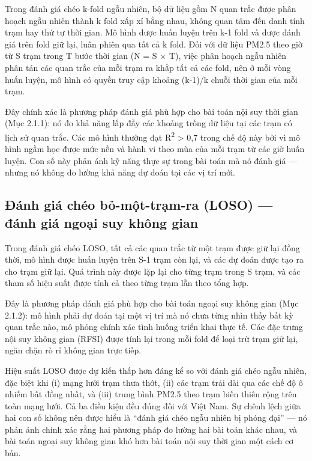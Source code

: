 Trong đánh giá chéo k-fold ngẫu nhiên, bộ dữ liệu gồm N quan trắc được phân hoạch ngẫu nhiên thành k fold xấp xỉ bằng nhau, không quan tâm đến danh tính trạm hay thứ tự thời gian. Mô hình được huấn luyện trên k-1 fold và được đánh giá trên fold giữ lại, luân phiên qua tất cả k fold. Đối với dữ liệu PM2.5 theo giờ từ S trạm trong T bước thời gian (N = S $\times$ T), việc phân hoạch ngẫu nhiên phân tán các quan trắc của mỗi trạm ra khắp tất cả các fold, nên ở mỗi vòng huấn luyện, mô hình có quyền truy cập khoảng (k-1)/k chuỗi thời gian của mỗi trạm.

Đây chính xác là phương pháp đánh giá phù hợp cho bài toán nội suy thời gian (Mục 2.1.1): nó đo khả năng lấp đầy các khoảng trống dữ liệu tại các trạm có lịch sử quan trắc. Các mô hình thường đạt R\textsuperscript{2} > 0,7 trong chế độ này bởi vì mô hình ngầm học được mức nền và hành vi theo mùa của mỗi trạm từ các giờ huấn luyện. Con số này phản ánh kỹ năng thực sự trong bài toán mà nó đánh giá --- nhưng nó không đo lường khả năng dự đoán tại các vị trí mới.

\subsection{Đánh giá chéo bỏ-một-trạm-ra (LOSO) --- đánh giá ngoại suy không gian}

Trong đánh giá chéo LOSO, tất cả các quan trắc từ một trạm được giữ lại đồng thời, mô hình được huấn luyện trên S-1 trạm còn lại, và các dự đoán được tạo ra cho trạm giữ lại. Quá trình này được lặp lại cho từng trạm trong S trạm, và các tham số hiệu suất được tính cả theo từng trạm lẫn theo tổng hợp.

Đây là phương pháp đánh giá phù hợp cho bài toán ngoại suy không gian (Mục 2.1.2): mô hình phải dự đoán tại một vị trí mà nó chưa từng nhìn thấy bất kỳ quan trắc nào, mô phỏng chính xác tình huống triển khai thực tế. Các đặc trưng nội suy không gian (RFSI) được tính lại trong mỗi fold để loại trừ trạm giữ lại, ngăn chặn rò rỉ không gian trực tiếp.

Hiệu suất LOSO được dự kiến thấp hơn đáng kể so với đánh giá chéo ngẫu nhiên, đặc biệt khi (i) mạng lưới trạm thưa thớt, (ii) các trạm trải dài qua các chế độ ô nhiễm bất đồng nhất, và (iii) trung bình PM2.5 theo trạm biến thiên rộng trên toàn mạng lưới. Cả ba điều kiện đều đúng đối với Việt Nam. Sự chênh lệch giữa hai con số không nên được hiểu là ``đánh giá chéo ngẫu nhiên bị phóng đại'' --- nó phản ánh chính xác rằng hai phương pháp đo lường hai bài toán khác nhau, và bài toán ngoại suy không gian khó hơn bài toán nội suy thời gian một cách cơ bản.

